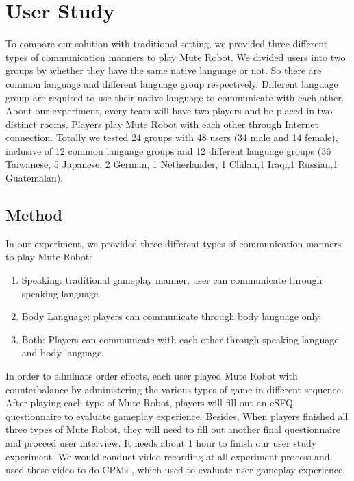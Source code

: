 

\section{User Study}

To compare our solution with traditional setting, we provided three different types of communication manners to play Mute Robot. We divided users into two groups by whether they have the same native language or not. So there are common language and different language group respectively. Different language group are required to use their native language to communicate with each other. About our experiment, every team will have two players and be placed in two distinct rooms. Players play Mute Robot with each other through Internet connection. Totally we tested 24 groups with 48 users (34 male and 14 female), inclusive of 12 common language groups and 12 different language groups (36 Taiwanese, 5 Japanese, 2 German, 1 Netherlander,  1 Chilan,1 Iraqi,1 Russian,1 Guatemalan).

\subsection{Method}

In our experiment, we provided three different types of communication manners to play Mute Robot:
\begin{enumerate}
    \item Speaking: 
    traditional gameplay manner, user can communicate through speaking language.
    \item Body Language: 
    players can communicate through body language only.
    \item Both:
    Players can communicate with each other through speaking language and body language.
\end{enumerate}

In order to eliminate order effects, each user played Mute Robot with counterbalance by administering the various types of game in different sequence. After playing each type of Mute Robot, players will fill out an eSFQ\cite{eSFQ} questionnaire to evaluate gameplay experience. Besides, When players finished all three types of Mute Robot, they will need to fill out another final questionnaire and proceed user interview. It needs about 1 hour to finish our user study experiment. We would conduct video recording at all experiment process and used these video to do CPMs\cite{CPMs} , which used to evaluate user gameplay experience.

